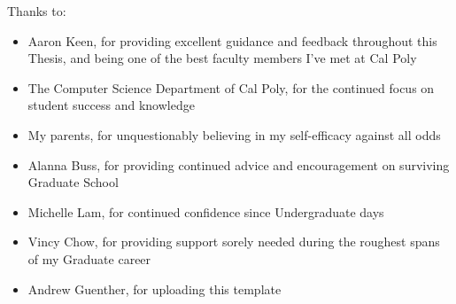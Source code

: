 \noindent
Thanks to:
\begin{itemize}
    \item Aaron Keen, for providing excellent guidance and feedback throughout this Thesis, and being one of the best faculty members I've met at Cal Poly
    \item The Computer Science Department of Cal Poly, for the continued focus on student success and knowledge
    \item My parents, for unquestionably believing in my self-efficacy against all odds
    \item Alanna Buss, for providing continued advice and encouragement on surviving Graduate School
    \item Michelle Lam, for continued confidence since Undergraduate days
    \item Vincy Chow, for providing support sorely needed during the roughest spans of my Graduate career
    \item Andrew Guenther, for uploading this template
\end{itemize}
